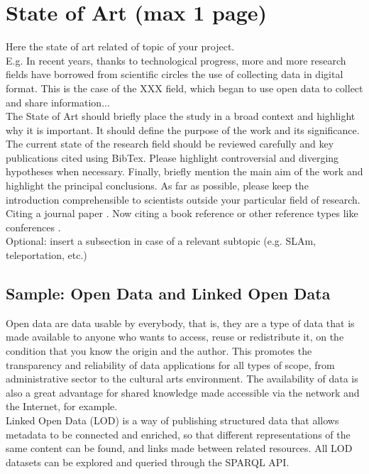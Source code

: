 \section{State of Art (max 1 page)}
Here the state of art  related of topic of your project. \\
E.g. In recent years, thanks to technological progress, more and more research fields have borrowed from scientific circles the use of collecting data in digital format. This is the case of the XXX field, which began to use open data to collect and share information... \\

The State of Art should briefly place the study in a broad context and highlight why it is important. It should define the purpose of the work and its significance. The current state of the research field should be reviewed carefully and key publications cited using BibTex. Please highlight controversial and diverging hypotheses when necessary. Finally, briefly mention the main aim of the work and highlight the principal conclusions. As far as possible, please keep the introduction comprehensible to scientists outside your particular field of research. Citing a journal paper \cite{knuth:1984}. Now citing a book reference \cite{texbook, latex:companion} or other reference types like conferences \cite{lesk:1977}.\\

Optional: insert a subsection in case of a relevant subtopic (e.g. SLAm, teleportation, etc.)\\


\subsection{Sample: Open Data and Linked Open Data}
Open data are data usable by everybody, that is, they are a type of data that is made available to anyone who wants to access, reuse or redistribute it, on the condition that you know the origin and the author. This promotes the transparency and reliability of data applications for all types of scope, from administrative sector to the cultural arts environment. The availability of data is also a great advantage for shared knowledge made accessible via the network and the Internet, for example.
\\

Linked Open Data (LOD) is a way of publishing structured data that allows metadata to be connected and enriched, so that different representations of the same content can be found, and links made between related resources. All LOD datasets can be explored and queried through the SPARQL API.


